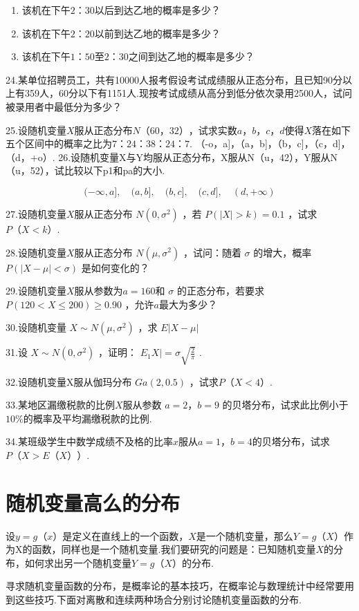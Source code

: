 \begin{enumerate}
	\item 该机在下午$ 2：30 $以后到达乙地的概率是多少？
	\item 该机在下午$ 2：20 $以前到达乙地的概率是多少？
	\item 该机在下午$ 1：50 $至$ 2：30 $之间到达乙地的概率是多少？
\end{enumerate}

24.某单位招聘员工，共有10000人报考假设考试成绩服从正态分布，且已知90分以上有359人，60分以下有1151人.现按考试成绩从高分到低分依次录用2500人，试问被录用者中最低分为多少？

25.设随机变量$ X $服从正态分布$ N（60，32） $，试求实数$ a，b，c，d $使得$ X $落在如下五个区间中的概率之比为$ 7：24：38：24：7 $.
（-o，a]，（a，b]，（b，c]，（c，d]，（d，+o）.
26.设随机变量X与Y均服从正态分布，X服从N（u，42），Y服从N（u，52），试比较以下p1和pa的大小.

\[
(-\infty, a], \quad(a, b], \quad(b, c], \quad(c, d], \quad(d,+\infty)
\]

27.设随机变量$ X $服从正态分布 $N\left(0, \sigma^{2}\right)$ ，若 $P(|X|>k)=0.1$ ，试求$ P（X<k） $.

28.设随机变量$ X $服从正态分布 $N\left(\mu, \sigma^{2}\right)$ ，试问：随着 $\sigma$ 的增大，概率 $P(|X-\mu|<\sigma)$ 是如何变化的？

29.设随机变量$ X $服从参数为$ a=160 $和 $\sigma$ 的正态分布，若要求 $P(120<X \leqslant 200) \geqslant 0.90 $ ，允许$ a $最大为多少？

30.设随机变量 $X \sim N\left(\mu, \sigma^{2}\right)$ ，求 $E | X-\mu | $ 

31.设 $X \sim N\left(0, \sigma^{2}\right)$ ，证明： $E_{1} X |=\sigma \sqrt{\frac{2}{\pi}}$ .

32.设随机变量X服从伽玛分布 $G a(2,0.5)$ ，试求$ P（X<4） $.

33.某地区漏缴税款的比例$ X $服从参数 $ a=2，b=9 $ 的贝塔分布，试求此比例小于$ 10\% $的概率及平均漏缴税款的比例.

34.某班级学生中数学成绩不及格的比率$ x $服从$ a=1，b=4 $的贝塔分布，试求$ P（X>E（X）） $.

\section{随机变量高么的分布}

设$ y=g（x） $是定义在直线上的一个函数，$ X $是一个随机变量，那么$ Y=g（X） $作为X的函数，同样也是一个随机变量.我们要研究的问题是：已知随机变量$ X $的分布，如何求出另一个随机变量$ Y=g（X） $的分布.

寻求随机变量函数的分布，是概率论的基本技巧，在概率论与数理统计中经常要用到这些技巧.下面对离散和连续两种场合分别讨论随机变量函数的分布.
